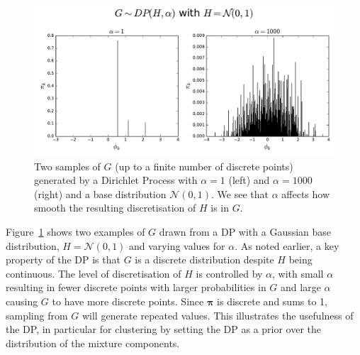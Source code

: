 \begin{figure}
\noindent \begin{centering}
\includegraphics[width=1.0\textwidth]{03-machine-learning/figures/dp_samples_stick.pdf}
\par\end{centering}
\caption{\label{fig:g-from-dp-stick}Two samples of $G$ (up to a finite number of discrete points) generated by a Dirichlet Process with $\alpha=1$ (left) and $\alpha=1000$ (right) and a base distribution $\mathcal{N}(0, 1)$. We see that $\alpha$ affects how smooth the resulting discretisation of $H$ is in $G$.}
\end{figure}

Figure~\ref{fig:g-from-dp-stick} shows two examples of $G$ drawn from a DP with a Gaussian base distribution, $H=\mathcal{N}(0, 1)$ and varying values for $\alpha$. As noted earlier, a key property of the DP is that $G$ is a discrete distribution despite $H$ being continuous. The level of discretisation of $H$ is controlled by $\alpha$, with small $\alpha$ resulting in fewer discrete points with larger probabilities in $G$ and large $\alpha$ causing $G$ to have more discrete points. Since $\boldsymbol{\pi}$ is discrete and sums to 1, sampling from $G$ will generate repeated values. This illustrates the usefulness of the DP, in particular for clustering by setting the DP as a prior over the distribution of the mixture components. 

